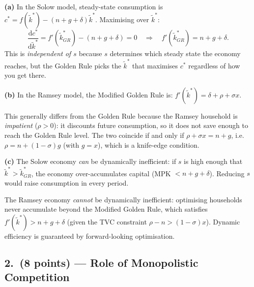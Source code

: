 \documentclass[a4paper,11pt]{article}
\newcommand{\ktilde}{\tilde{k}}
\newcommand{\dd}{\mathrm{d}}
\begin{document}
\begin{answerbox}
\textbf{(a)} In the Solow model, steady-state consumption is
$c^* = f(\ktilde^*) - (n+g+\delta)\ktilde^*$.  Maximising over $\ktilde^*$:
\[
    \frac{\dd c^*}{\dd\ktilde^*} = f'(\ktilde^*_{GR}) - (n+g+\delta) = 0
    \quad\Longrightarrow\quad
    \boxed{f'(\ktilde^*_{GR}) = n + g + \delta.}
\]
This is \emph{independent of $s$} because $s$ determines which steady state the economy
reaches, but the Golden Rule picks the $\ktilde^*$ that maximises $c^*$ regardless of
how you get there.

\textbf{(b)} In the Ramsey model, the Modified Golden Rule is:
$f'(\ktilde^*) = \delta + \rho + \sigma x$.

This generally differs from the Golden Rule because the Ramsey household is
\emph{impatient} ($\rho > 0$): it discounts future consumption, so it does not save
enough to reach the Golden Rule level.  The two coincide if and only if
$\rho + \sigma x = n + g$, i.e.\ $\rho = n + (1-\sigma)g$ (with $g=x$), which is
a knife-edge condition.

\textbf{(c)} The Solow economy \emph{can} be dynamically inefficient: if $s$ is high
enough that $\ktilde^* > \ktilde^*_{GR}$, the economy over-accumulates capital (MPK $< n+g+\delta$).
Reducing $s$ would raise consumption in every period.

The Ramsey economy \emph{cannot} be dynamically inefficient: optimising households never
accumulate beyond the Modified Golden Rule, which satisfies $f'(\ktilde^*) > n+g+\delta$
(given the TVC constraint $\rho - n > (1-\sigma)x$).  Dynamic efficiency is guaranteed
by forward-looking optimisation.
\end{answerbox}

\subsection*{2.\ (8 points) --- Role of Monopolistic Competition}
\end{document}
